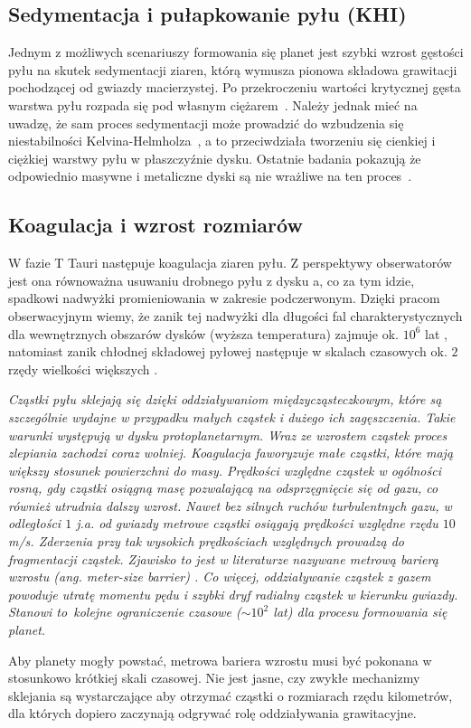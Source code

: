 \subsection{Sedymentacja i pułapkowanie pyłu (KHI)}
\par Jednym z możliwych scenariuszy formowania się planet jest szybki wzrost
gęstości pyłu na skutek sedymentacji ziaren, którą wymusza pionowa składowa
grawitacji pochodzącej od gwiazdy macierzystej. Po przekroczeniu wartości
krytycznej gęsta warstwa pyłu rozpada się pod własnym ciężarem~\citep{GW73}.
Należy jednak mieć na uwadzę, że sam proces sedymentacji może prowadzić do
wzbudzenia się niestabilności Kelvina-Helmholza~\cite{JHK06}, a to przeciwdziała
tworzeniu się cienkiej i ciężkiej warstwy pyłu w płaszczyźnie dysku. Ostatnie
badania pokazują że odpowiednio masywne i metaliczne dyski są nie wrażliwe na
ten proces~\citep{L10}.


\subsection{Koagulacja i wzrost rozmiarów}
W fazie T Tauri następuje koagulacja ziaren pyłu. Z perspektywy obserwatorów
jest ona równoważna usuwaniu drobnego pyłu z dysku a, co za tym idzie, spadkowi
nadwyżki promieniowania w zakresie podczerwonym. Dzięki pracom obserwacyjnym
wiemy, że zanik tej nadwyżki dla długości fal charakterystycznych dla
wewnętrznych obszarów dysków (wyższa temperatura) zajmuje ok. $10^6$ lat
\cite{hillenbrand}, natomiast zanik chłodnej składowej pyłowej następuje w
skalach czasowych ok. $2$ rzędy wielkości większych \cite{carpenter}.


{\it
Cząstki pyłu sklejają się dzięki oddziaływaniom międzycząsteczkowym, które są
szczególnie wydajne w przypadku małych cząstek i dużego ich zagęszczenia. Takie
warunki występują w dysku protoplanetarnym. Wraz ze wzrostem cząstek proces
zlepiania zachodzi coraz wolniej. Koagulacja faworyzuje małe cząstki, które mają
większy stosunek powierzchni do masy. Prędkości względne cząstek w ogólności
rosną, gdy cząstki osiągną masę pozwalającą na odsprzęgnięcie się od gazu, co
również utrudnia dalszy wzrost. Nawet bez silnych ruchów turbulentnych gazu, w
odległości $1$ j.a. od gwiazdy metrowe cząstki osiągają prędkości względne rzędu
$10$ m/s. Zderzenia przy tak wysokich prędkościach względnych prowadzą do
fragmentacji cząstek. Zjawisko to jest w literaturze nazywane metrową barierą
wzrostu (ang. {\it meter-size barrier}) \cite{ormel}. Co więcej, oddziaływanie
cząstek z gazem powoduje utratę momentu pędu i szybki dryf radialny cząstek w
kierunku gwiazdy. Stanowi to~kolejne ograniczenie czasowe ($\sim 10^2$ lat) dla
procesu formowania się planet.

Aby planety mogły powstać, metrowa bariera wzrostu musi być pokonana w
stosunkowo krótkiej skali czasowej. Nie jest jasne, czy zwykłe mechanizmy
sklejania są wystarczające aby otrzymać cząstki o rozmiarach rzędu kilometrów,
dla których dopiero zaczynają odgrywać rolę oddziaływania grawitacyjne.
}

